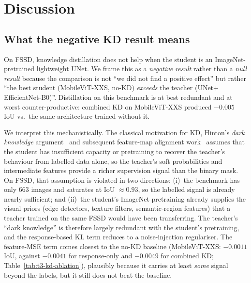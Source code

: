 
\section{Discussion}
\label{sec:discussion}

\subsection{What the negative KD result means}
\label{sec:discussion-negative-kd}

On FSSD, knowledge distillation does not help when the student is an ImageNet-pretrained lightweight UNet. We frame this as a \emph{negative result} rather than a \emph{null result} because the comparison is not ``we did not find a positive effect'' but rather ``the best student (MobileViT-XXS, no-KD) \emph{exceeds} the teacher (UNet$+$EfficientNet-B0)''. Distillation on this benchmark is at best redundant and at worst counter-productive: combined KD on MobileViT-XXS produced $-0.005$ IoU vs.~the same architecture trained without it.

We interpret this mechanistically. The classical motivation for KD, Hinton's \emph{dark knowledge} argument~\cite{hinton2015distilling} and subsequent feature-map alignment work~\cite{romero2015fitnets,liu2019structured,wang2020intra,he2021channel} assumes that the student has insufficient capacity or pretraining to recover the teacher's behaviour from labelled data alone, so the teacher's soft probabilities and intermediate features provide a richer supervision signal than the binary mask. On FSSD, that assumption is violated in two directions: (i)~the benchmark has only 663 images and saturates at IoU $\approx 0.93$, so the labelled signal is already nearly sufficient; and (ii)~the student's ImageNet pretraining already supplies the visual priors (edge detectors, texture filters, semantic-region features) that a teacher trained on the same FSSD would have been transferring. The teacher's ``dark knowledge'' is therefore largely redundant with the student's pretraining, and the response-based KL term reduces to a noise-injection regulariser. The feature-MSE term comes closest to the no-KD baseline (MobileViT-XXS: $-0.0011$ IoU, against $-0.0041$ for response-only and $-0.0049$ for combined KD; Table~\ref{tab:t3-kd-ablation}), plausibly because it carries at least \emph{some} signal beyond the labels, but it still does not beat the baseline.

